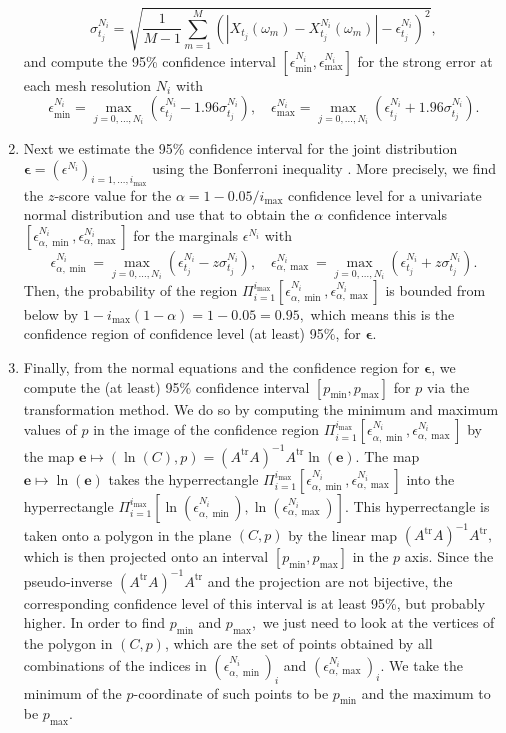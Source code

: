 \documentclass[reqno,12pt]{amsart}
\theoremstyle{plain} %
\theoremstyle{definition} %
\newcommand{\tr}{{\operatorname{tr}}}
\begin{document}
\begin{enumerate}
    \[
        \sigma_{t_j}^{N_i} = \sqrt{\frac{1}{M-1}\sum_{m=1}^M \left(\left|X_{t_j}(\omega_m) - X_{t_j}^{N_i}(\omega_m) \right|- \epsilon_{t_j}^{N_i}\right)^2},
    \]
    and compute the 95\% confidence interval $[\epsilon_{\min}^{{N_i}}, \epsilon_{\max}^{{N_i}}]$ for the strong error at each mesh resolution $N_i$ with
    \[
        \epsilon_{\min}^{N_i} = \max_{j=0, \ldots, N_i} (\epsilon_{t_j}^{N_i} - {1.96}\sigma_{t_j}^{N_i}), \quad \epsilon_{\max}^{N_i} = \max_{j=0, \ldots, N_i} (\epsilon_{t_j}^{N_i} + {1.96}\sigma_{t_j}^{N_i}).
    \]
    \item Next we estimate the 95\% confidence interval for the joint distribution $\boldsymbol{\epsilon} = (\epsilon^{N_i})_{i=1, \ldots, i_{\max}}$ using the Bonferroni inequality \cite{JohnsonWichern2007}. More precisely, we find the $z$-score value for the $\alpha = 1 - 0.05/i_{\max}$ confidence level for a univariate normal distribution and use that to obtain the $\alpha$ confidence intervals $[\epsilon_{\alpha, \min}^{N_i}, \epsilon_{\alpha, \max}^{N_i}]$ for the marginals $\epsilon^{N_i}$ with 
    \[
        \epsilon_{\alpha, \min}^{N_i} = \max_{j=0, \ldots, N_i} (\epsilon_{t_j}^{N_i} - z\sigma_{t_j}^{N_i}), \quad \epsilon_{\alpha,\max}^{N_i} = \max_{j=0, \ldots, N_i} (\epsilon_{t_j}^{N_i} + z\sigma_{t_j}^{N_i}).
    \]
    Then, the probability of the region $\Pi_{i=1}^{i_{\max}} [\epsilon_{\alpha, \min}^{N_i}, \epsilon_{\alpha, \max}^{N_i}]$ is bounded from below by $1 - i_{\max}(1 - \alpha) = 1 - 0.05 = 0.95,$ which means this is the confidence region of confidence level (at least) 95\%, for $\boldsymbol{\epsilon}$.
    
    \item Finally, from the normal equations and the confidence region for $\boldsymbol{\epsilon}$, we compute the (at least) 95\% confidence interval $[p_{\min}, p_{\max}]$ for $p$ via the transformation method. We do so by computing the minimum and maximum values of $p$ in the image of the confidence region $\Pi_{i=1}^{i_{\max}} [\epsilon_{\alpha, \min}^{N_i}, \epsilon_{\alpha, \max}^{N_i}]$ by the map $\mathbf{e} \mapsto (\ln(C), p) = (A^\tr A)^{-1}A^\tr \ln(\mathbf{e})$. The map $\mathbf{e} \mapsto \ln(\mathbf{e})$ takes the hyperrectangle $\Pi_{i=1}^{i_{\max}} [\epsilon_{\alpha, \min}^{N_i}, \epsilon_{\alpha, \max}^{N_i}]$ into the hyperrectangle $\Pi_{i=1}^{i_{\max}} [\ln(\epsilon_{\alpha, \min}^{N_i}), \ln(\epsilon_{\alpha, \max}^{N_i})].$ This hyperrectangle is taken onto a polygon in the plane $(C, p)$ by the linear map ${(A^\tr A)^{-1}A^\tr },$ which is then projected onto an interval $[p_{\min}, p_{\max}]$ in the $p$ axis. Since the pseudo-inverse ${(A^\tr A)^{-1}A^\tr }$ and the projection are not bijective, the corresponding confidence level of this interval is at least 95\%, but probably higher. In order to find $p_{\min}$ and $p_{\max},$ we just need to look at the vertices of the polygon in $(C, p)$, which are the set of points obtained by all combinations of the indices in $(\epsilon_{{\alpha,}\min}^{N_i})_i$ and $(\epsilon_{{\alpha,}\max}^{N_i})_i.$ We take the minimum of the $p$-coordinate of such points to be $p_{\min}$ and the maximum to be $p_{\max}.$
\end{enumerate}
\end{document}
